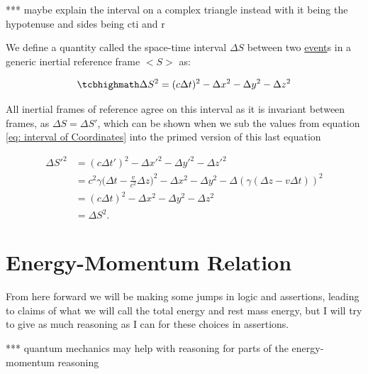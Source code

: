 *** maybe explain the interval on a complex triangle instead with it being the hypotenuse and sides being cti and r

We define a quantity called the space-time interval $\Delta S$ between two \hyperlink{def-event}{event}s in a generic inertial reference frame $<\!\!S\!>$ as:

\begin{equation}
	\mhl{
		\Delta S^2 = (c\Delta t)^2 -\Delta x^2 -\Delta y^2 -\Delta z^2
	}
	\label{eq: space-time interval}
\end{equation}

All inertial frames of reference agree on this interval as it is invariant between frames, as $\Delta S=\Delta S'$, which can be shown when we sub the values from equation \eqref{eq: interval of Coordinates} into the primed version of this last equation

\begin{equation}
	\begin{aligned}
		\Delta S'^2 & = (c\Delta t')^2 -\Delta x'^2 -\Delta y'^2 -\Delta z'^2                                                                            \\
		            & = c^2{\gamma} \bigg( \Delta t-\frac{v}{c^2} \Delta z \bigg)^2 -\Delta x^2 -\Delta y^2 -\Delta ({\gamma} ( \Delta z-v \Delta t) )^2 \\
		            & = (c\Delta t)^2 -\Delta x^2 -\Delta y^2 -\Delta z^2                                                                                \\
		            & = \Delta S^2.
	\end{aligned}
\end{equation}

\section{Energy-Momentum Relation}

From here forward we will be making some jumps in logic and assertions, leading to claims of what we will call the total energy and rest mass energy, but I will try to give as much reasoning as I can for these choices in assertions.

*** quantum mechanics may help with reasoning for parts of the energy-momentum reasoning


